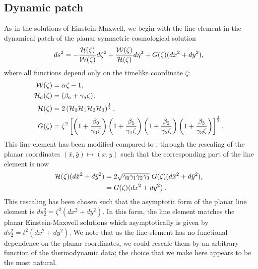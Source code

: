 \subsection{Dynamic patch}
\label{sec:studynamicthermo}
As in the solutions of Einstein-Maxwell, we begin with the line element in the dynamical patch of the planar symmetric cosmological solution 
\begin{equation}
\label{eq:STUline}
    ds^2  = - \frac{{\cal H}(\zeta)}{{\cal W}(\zeta)} d\zeta^2 +  \frac{{\cal W}(\zeta)}{{\cal H}(\zeta)} d\eta^2 +  G(\zeta)  (dx^2 + dy^2),
\end{equation}
where all functions depend only on the timelike coordinate $\zeta$:
\begin{equation*}
\begin{aligned}
    {\cal W}(\zeta) &= \alpha \zeta - 1, \\
    {\cal H}_a(\zeta) &= (\beta_a + \gamma_a \zeta) ,\\
    {\cal H}(\zeta) &= 2 \left({\cal H}_0 {\cal H}_1 {\cal H}_2 {\cal H}_3 \right)^{\frac{1}{2}}, \\
    G(\zeta) &= \zeta^2  \left[\left(1 + \frac{\beta_0}{\gamma_0 \zeta}\right)\left(1 + \frac{\beta_1}{\gamma_1 \zeta}\right)\left(1 + \frac{\beta_2}{\gamma_2 \zeta}\right)\left(1 + \frac{\beta_3}{\gamma_3 \zeta}\right)\right]^{\frac{1}{2}}.
\end{aligned}
\end{equation*}
This line element has been modified compared to , through the rescaling of the planar coordinates $(\bar{x},\bar{y}) \mapsto (x,y)$ such that the corresponding part of the line element is now
 \begin{equation*}
 \begin{aligned}
          {\cal H}(\zeta) (d\bar{x}^2 + d\bar{y}^2) &= 2\sqrt{\gamma_0\gamma_1\gamma_2\gamma_3} \; G(\zeta) (d\bar{x}^2 + d\bar{y}^2), \\ &=  G(\zeta)(dx^2 + dy^2)  \;.
 \end{aligned}
 \end{equation*}
 This rescaling has been chosen such that the asymptotic form of the planar line element is $ds^2_2 = \zeta^2(dx^2 + dy^2)$. In this form, the line element matches the planar Einstein-Maxwell solutions which asymptotically is given by $ds^2_2 = t^2 (dx^2 + dy^2)$. We note that as the line element has no functional dependence on the planar coordinates, we could rescale them by an arbitrary function of the thermodynamic data; the choice that we make here appears to be the most natural.
 
